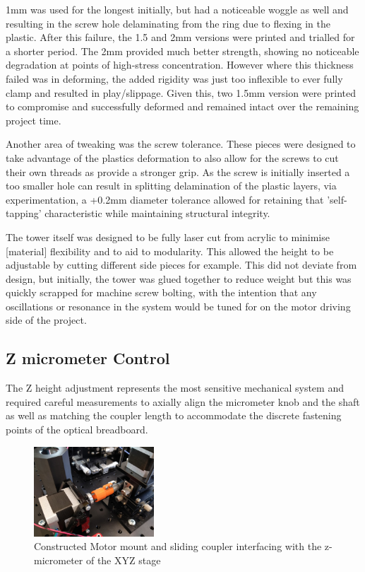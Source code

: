 1mm was used for the longest initially, but had a noticeable woggle as well and resulting in the screw hole delaminating from the ring due to flexing in the plastic. After this failure, the 1.5 and 2mm versions were printed and trialled for a shorter period. The 2mm provided much better strength, showing no noticeable degradation at points of high-stress concentration. However where this thickness failed was in deforming, the added rigidity was just too inflexible to ever fully clamp and resulted in play/slippage. Given this, two 1.5mm version were printed to compromise and successfully deformed and remained intact over the remaining project time.   

Another area of tweaking was the screw tolerance. These pieces were designed to take advantage of the plastics deformation to also allow for the screws to cut their own threads as provide a stronger grip. As the screw is initially inserted a too smaller hole can result in splitting delamination of the plastic layers, via experimentation, a +0.2mm diameter tolerance allowed for retaining that 'self-tapping' characteristic while maintaining structural integrity. 

The tower itself was designed to be fully laser cut from acrylic to minimise [material] flexibility and to aid to modularity. This allowed the height to be adjustable by cutting different side pieces for example. This did not deviate from design, but initially, the tower was glued together to reduce weight but this was quickly scrapped for machine screw bolting, with the intention that any oscillations or resonance in the system would be tuned for on the motor driving side of the project.

\subsection{Z micrometer Control}

The Z height adjustment represents the most sensitive mechanical system and required careful measurements to axially align the micrometer knob and the shaft as well as matching the coupler length to accommodate the discrete fastening points of the optical breadboard. 

\begin{figure}
    \centering
    \includegraphics[width=0.4\textwidth]{img/impl_coup.jpg}
    \caption{Constructed Motor mount and sliding coupler interfacing with the z-micrometer of the XYZ stage}
    \label{fig:z_coup}
\end{figure}

